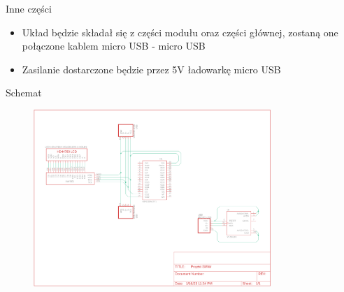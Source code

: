 \documentclass[11pt]{beamer}
\begin{document}
\begin{frame}{Inne części}
    \begin{itemize}
        \item Układ będzie składał się z części modułu oraz części głównej, zostaną one połączone kablem micro USB - micro USB
        \item Zasilanie dostarczone będzie przez 5V ładowarkę micro USB 
    \end{itemize}
\end{frame}

\begin{frame}{Schemat}

    \begin{figure}
        \includegraphics[width=0.8\textwidth]{images/schematic}
    \end{figure}
\end{frame}
\end{document}
